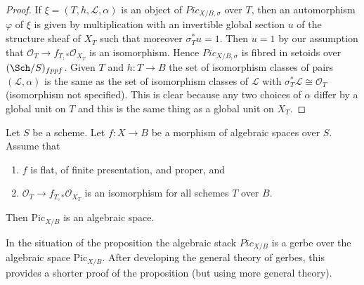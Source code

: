 \begin{proof}
If $\xi = (T, h, \mathcal{L}, \alpha)$
is an object of $\textit{Pic}_{X/B, \sigma}$
over $T$, then an automorphism $\varphi$ of
$\xi$ is given by multiplication with an invertible global section $u$
of the structure sheaf of $X_T$ such that moreover $\sigma_T^*u = 1$.
Then $u = 1$ by our assumption that
$\mathcal{O}_T \to f_{T, *}\mathcal{O}_{X_T}$ is an isomorphism.
Hence $\textit{Pic}_{X/B, \sigma}$
is fibred in setoids over $(\Sch/S)_{fppf}$.
Given $T$ and $h : T \to B$
the set of isomorphism classes of pairs $(\mathcal{L}, \alpha)$
is the same as the set of isomorphism classes of $\mathcal{L}$
with $\sigma_T^*\mathcal{L} \cong \mathcal{O}_T$ (isomorphism
not specified). This is clear because any two choices
of $\alpha$ differ by a global unit on $T$ and this is the
same thing as a global unit on $X_T$.
\end{proof}

\begin{proposition}
\label{proposition-pic-functor}
Let $S$ be a scheme. Let $f : X \to B$ be a morphism of algebraic
spaces over $S$. Assume that
\begin{enumerate}
\item $f$ is flat, of finite presentation, and proper, and
\item $\mathcal{O}_T \to f_{T, *}\mathcal{O}_{X_T}$ is an isomorphism
for all schemes $T$ over $B$.
\end{enumerate}
Then $\text{Pic}_{X/B}$ is an algebraic space.
\end{proposition}

\noindent
In the situation of the proposition the algebraic stack
$\textit{Pic}_{X/B}$ is a gerbe over the algebraic space
$\text{Pic}_{X/B}$. After developing the general
theory of gerbes, this provides a shorter proof of
the proposition (but using more general theory).

